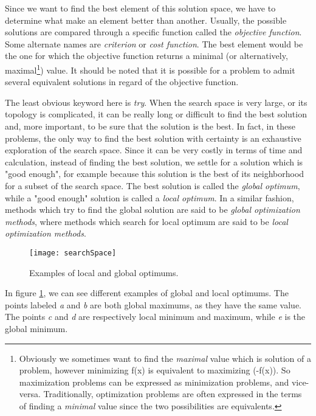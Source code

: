 Since we want to find the best element of this solution space, we have to determine what make an element better than another. Usually, the possible solutions are compared through a specific function called the \emph{objective function}. Some alternate names are \emph{criterion} or \emph{cost function}. The best element would be the one for which the objective function returns a minimal (or alternatively, maximal\footnote{Obviously we sometimes want to find the \emph{maximal} value which is solution of a problem, however minimizing f(x) is equivalent to maximizing (-f(x)). So maximization problems can be expressed as minimization problems, and vice-versa. Traditionally, optimization problems are often expressed in the terms of finding a \emph{minimal} value since the two possibilities are equivalents.}) value. It should be noted that it is possible for a problem to admit several equivalent solutions in regard of the objective function.


The least obvious keyword here is \emph{try}. When the search space is very large, or its topology is complicated, it can be really long or difficult to find the best solution and, more important, to be sure that the solution is the best. In fact, in these problems, the only way to find the best solution with certainty is an exhaustive exploration of the search space. Since it can be very costly in terms
of time and calculation, instead of finding the best solution, we settle for a solution which is "good enough", for example because this solution is the best of its neighborhood for a subset of the search space. The best solution is called the \emph{global optimum}, while a "good enough" solution is called a \emph{local optimum}. In a similar fashion, methods which try to find the global solution are said to be \emph{global optimization methods}, where methods which search for local optimum are said to be \emph{local optimization methods}.


\begin{figure}
\centering
\texttt{[image: searchSpace]}
\caption{Examples of local and global optimums.}
\label{localAndGlobalOptims}
\end{figure}

In figure \ref{localAndGlobalOptims}, we can see different examples of global and local optimums. The points labeled \emph{a} and \emph{b} are both global maximums, as they have the same value. The points
\emph{c} and \emph{d} are respectively local minimum and maximum, while \emph{e} is the global minimum.

